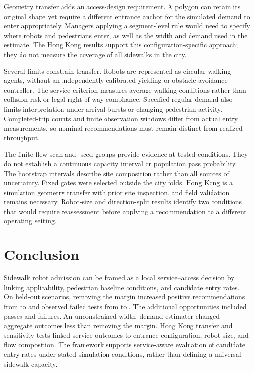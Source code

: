 \documentclass[NewProceedings,letterpaper]{ascelike-new}
\begin{document}
Geometry transfer adds an access-design requirement. A polygon can retain its original shape yet require a different entrance anchor for the simulated demand to enter appropriately. Managers applying a segment-level rule would need to specify where robots and pedestrians enter, as well as the width and demand used in the estimate. The Hong Kong results support this configuration-specific approach; they do not measure the coverage of all sidewalks in the city.

Several limits constrain transfer. Robots are represented as circular walking agents, without an independently calibrated yielding or obstacle-avoidance controller. The service criterion measures average walking conditions rather than collision risk or legal right-of-way compliance. Specified regular demand also limits interpretation under arrival bursts or changing pedestrian activity. Completed-trip counts and finite observation windows differ from actual entry measurements, so nominal recommendations must remain distinct from realized throughput.

The finite flow scan and \SeedN{}-seed groups provide evidence at tested conditions. They do not establish a continuous capacity interval or population pass probability. The bootstrap intervals describe site composition rather than all sources of uncertainty. Fixed gates were selected outside the city folds. Hong Kong is a simulation geometry transfer with prior site inspection, and field validation remains necessary. Robot-size and direction-split results identify two conditions that would require reassessment before applying a recommendation to a different operating setting.

\section{Conclusion}
Sidewalk robot admission can be framed as a local service--access decision by linking applicability, pedestrian baseline conditions, and candidate entry rates. On \EvalN{} held-out scenarios, removing the margin increased positive recommendations from \MZeroPositive{} to \MOnePositive{} and observed failed tests from \MZeroFail{} to \MOneFail{}. The additional \MZeroMOnePositive{} opportunities included \WithdrawnPass{} passes and \WithdrawnFail{} failures. An unconstrained width--demand estimator changed aggregate outcomes less than removing the margin. Hong Kong transfer and sensitivity tests linked service outcomes to entrance configuration, robot size, and flow composition. The framework supports service-aware evaluation of candidate entry rates under stated simulation conditions, rather than defining a universal sidewalk capacity.


\end{document}
